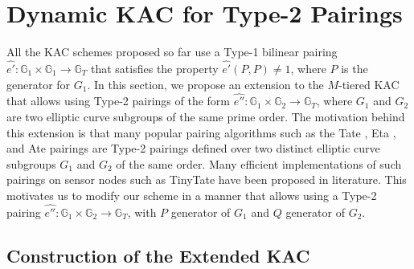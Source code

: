 \section{Dynamic KAC for Type-2 Pairings}
\label{sec:extended}

All the KAC schemes proposed so far use a Type-1 bilinear pairing $\hat{e'}:\mathbb{G}_1 \times \mathbb{G}_1\longrightarrow\mathbb{G}_T$ that satisfies the property $\hat{e'}(P,P) \neq 1$, where $P$ is the generator for $G_1$. In this section, we propose an extension to the $M$-tiered KAC that allows using Type-2 pairings of the form $\hat{e''}:\mathbb{G}_1 \times \mathbb{G}_2\longrightarrow\mathbb{G}_T$, where $G_1$ and $G_2$ are two elliptic curve subgroups of the same prime order. The motivation behind this extension is that many popular pairing algorithms such as the Tate \cite{frey1994remark}, Eta \cite{hess2006eta}, and Ate \cite{zhao2008note} pairings are Type-2 pairings defined over two distinct elliptic curve subgroups $G_1$ and $G_2$ of the same order. Many efficient implementations of such pairings on sensor nodes such as TinyTate \cite{oliveira2007tinytate} have been proposed in literature. This motivates us to modify our scheme in a manner that allows using a Type-2 pairing $\hat{e''}:\mathbb{G}_1 \times \mathbb{G}_2\longrightarrow\mathbb{G}_T$, with $P$ generator of $G_1$ and $Q$ generator of $G_2$. 


\subsection{Construction of the Extended KAC}
\label{subsec:construction}


